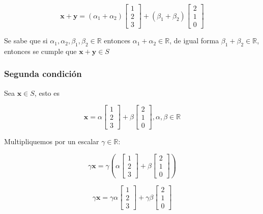\[
\mathbf{x} + \mathbf{y} = ({\alpha}_{1}+{\alpha}_{2}) 
\begin{bmatrix}
1 \\ 
2 \\ 
3
\end{bmatrix}
+
({\beta}_{1}+{\beta}_{2})
\begin{bmatrix}
2 \\ 
1 \\ 
0
\end{bmatrix}
\]

Se sabe que si ${\alpha}_{1},{\alpha}_{2},{\beta}_{1},{\beta}_{2} \in \mathbb{R}$ entonces ${\alpha}_{1}+{\alpha}_{2} \in \mathbb{R}$, de igual forma ${\beta}_{1}+{\beta}_{2} \in \mathbb{R}$, entonces se cumple que $\mathbf{x} +\mathbf{y} \in S$

\subsubsection{Segunda condición}
Sea $\mathbf{x} \in S$, esto es

\[
\mathbf{x} = \alpha 
\begin{bmatrix}
1 \\ 
2 \\ 
3
\end{bmatrix}
+
\beta
\begin{bmatrix}
2 \\ 
1 \\ 
0
\end{bmatrix}, \alpha , \beta \in \mathbb{R}
\]

Multipliquemos por un escalar $\gamma \in \mathbb{R}$:

\[
\gamma \mathbf{x} = \gamma \left( \alpha 
\begin{bmatrix}
1 \\ 
2 \\ 
3
\end{bmatrix}
+
\beta
\begin{bmatrix}
2 \\ 
1 \\ 
0
\end{bmatrix} \right)
\]

\[
\gamma \mathbf{x} = \gamma \alpha 
\begin{bmatrix}
1 \\ 
2 \\ 
3
\end{bmatrix}
+
\gamma \beta
\begin{bmatrix}
2 \\ 
1 \\ 
0
\end{bmatrix}
\]

